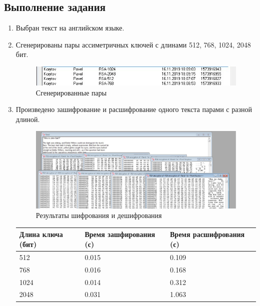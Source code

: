 \documentclass[a4paper, 14pt]{extarticle}
\begin{document}
\subsection{Выполнение задания}
\begin{enumerate}
    \item Выбран текст на английском языке.

    \item Сгенерированы пары ассиметричных ключей с длинами 512, 768, 1024, 2048 бит.
    \begin{figure}[h]
        \centering
        \includegraphics[width=\textwidth]{img/S005.jpg}
        \caption{Сгенерированные пары}%
        \label{img:c:1}
    \end{figure}
    
    \item Произведено зашифрование и расшифрование одного текста парами с разной длиной.
    \begin{figure}[h]
        \centering
        \includegraphics[width=\textwidth]{img/S006.jpg}
        \caption{Результаты шифрования и дешифрования}%
        \label{img:c:2}
    \end{figure}
    
    \FloatBarrier{}
    \begin{table}[h]
    \centering
    \begin{tabular}{@{}lll@{}}
    \toprule
    \textbf{Длина ключа (бит)} & \textbf{Время зашфирования (с)} & \textbf{Время расшифрования (с)} \\ \midrule
    512                        & 0.015                           & 0.109                            \\
    768                        & 0.016                           & 0.168                            \\
    1024                       & 0.014                           & 0.312                            \\
    2048                       & 0.031                           & 1.063                            \\ \bottomrule
    \end{tabular}
    \end{table}
\end{enumerate}
\end{document}
